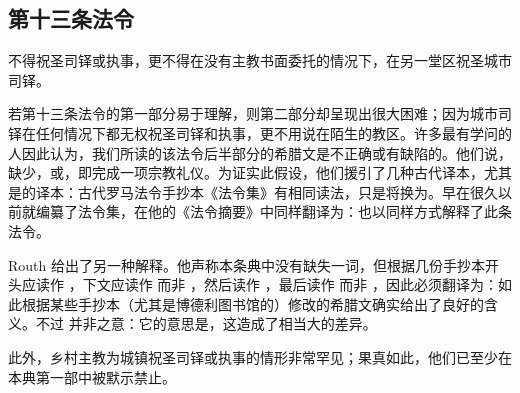 \subsection{第十三条法令}

不得祝圣司铎或执事，更不得在没有主教书面委托的情况下，在另一堂区祝圣城市司铎。\par

若第十三条法令的第一部分易于理解，则第二部分却呈现出很大困难；因为城市司铎在任何情况下都无权祝圣司铎和执事，更不用说在陌生的教区。许多最有学问的人因此认为，我们所读的该法令后半部分的希腊文是不正确或有缺陷的。他们说，缺少，或，即完成一项宗教礼仪。为证实此假设，他们援引了几种古代译本，尤其是的译本：古代罗马法令手抄本《法令集》有相同读法，只是将换为。早在很久以前就编纂了法令集，在他的《法令摘要》中同样翻译为：也以同样方式解释了此条法令。\par

Routh 给出了另一种解释。他声称本条典中没有缺失一词，但根据几份手抄本开头应读作 ，下文应读作  而非 ，然后读作  ，最后读作  而非 ，因此必须翻译为：如此根据某些手抄本（尤其是博德利图书馆的）修改的希腊文确实给出了良好的含义。不过  并非之意：它的意思是，这造成了相当大的差异。\par

此外，乡村主教为城镇祝圣司铎或执事的情形非常罕见；果真如此，他们已至少在本典第一部中被默示禁止。\par

